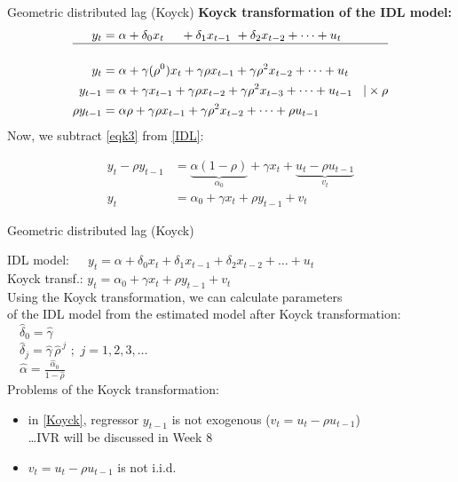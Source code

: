 \documentclass{beamer}
\begin{document}
\begin{frame}{Geometric distributed lag (Koyck) }
\textbf{Koyck transformation of the IDL model:}
\begin{align} 
y_t & = \alpha + \delta_0 x_t \,\,\,\,\,\,\,\, + \delta_1 x_{t-1} \,\,+ \delta_2 x_{t-2} + \dots + u_t \notag \\
\hline \notag \\ 
y_t & = \alpha + \gamma (\rho^0) x_t + \gamma\rho x_{t-1} + \gamma\rho^2 x_{t-2}+\dots + u_t \label{IDL} \\ 
y_{t-1} & = \alpha + \gamma x_{t-1} + \gamma\rho x_{t-2} + \gamma\rho^2 x_{t-3} + \dots+u_{t-1} \hspace{0.3cm} |\times \rho 
\\ \label{eqk3}
\rho y_{t-1} & = \alpha\rho + \gamma\rho x_{t-1} + \gamma \rho^2 x_{t-2} + \dots + \rho u_{t-1}
\end{align}
\centering Now, we subtract \eqref{eqk3} from \eqref{IDL}: \par
\begin{align}
y_t-\rho y_{t-1} & = \underbrace{\alpha(1-\rho)}_{\alpha_{0}}+\gamma x_t + \underbrace{u_t-\rho u_{t-1}}_{v_t}\\
y_t & = \alpha_0 + \gamma x_t + \rho y_{t-1} + v_t \label{Koyck}
\end{align}
\end{frame}

\begin{frame}{Geometric distributed lag (Koyck) }

IDL model: $\quad \,y_t = \alpha + \delta_0 x_t  + \delta_1 x_{t-1} + \delta_2 x_{t-2} + \dots + u_t $\\
\medskip
Koyck transf.: $y_t = \alpha_0 + \gamma x_t + \rho y_{t-1} + v_t$ \\
\medskip
Using the Koyck transformation, we can calculate parameters \\of the IDL model from the estimated model after Koyck transformation:\\
\medskip
$\quad \hat{\delta}_0 = \hat{\gamma}$ \\
\medskip
$\quad \hat{\delta}_j = \hat{\gamma} \, \hat{\rho}^{\,j} \,\, ; \,\, j = 1,2,3, \dots$ \\
\medskip
$\quad \hat{\alpha} = \frac{\hat{\alpha}_0}{1-\hat{\rho}}$\\
\medskip
Problems of the Koyck transformation:
\begin{itemize}
    \item in \eqref{Koyck}, regressor $y_{t-1}$ is not exogenous ($v_t=u_t-\rho u_{t-1}$)\\ \dots IVR will be discussed in Week 8
    \item $v_t=u_t-\rho u_{t-1}$ is not i.i.d.
\end{itemize}


\end{frame}
\end{document}
